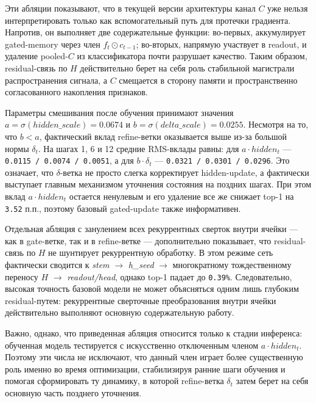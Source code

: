 \documentclass[11pt,landscape]{article}
\begin{document}
\medskip

\noindent
Эти абляции показывают, что в текущей версии архитектуры канал $C$ уже нельзя интерпретировать только как вспомогательный путь для протечки градиента. Напротив, он выполняет две содержательные функции: во-первых, аккумулирует gated-memory через член $f_t \odot c_{t-1}$; во-вторых, напрямую участвует в readout, и удаление pooled-$C$ из классификатора почти разрушает качество. Таким образом, residual-связь по $H$ действительно берет на себя роль стабильной магистрали распространения сигнала, а $C$ смещается в сторону памяти и пространственно согласованного накопления признаков.

\medskip

\noindent
Параметры смешивания после обучения принимают значения $a=\sigma(hidden\_scale)=0.0674$ и $b=\sigma(delta\_scale)=0.0255$. Несмотря на то, что $b < a$, фактический вклад refine-ветки оказывается выше из-за большой нормы $\delta_t$. На шагах 1, 6 и 12 средние RMS-вклады равны: для $a \cdot hidden_t$ --- \texttt{0.0115 / 0.0074 / 0.0051}, а для $b \cdot \delta_t$ --- \texttt{0.0321 / 0.0301 / 0.0296}. Это означает, что $\delta$-ветка не просто слегка корректирует hidden-update, а фактически выступает главным механизмом уточнения состояния на поздних шагах. При этом вклад $a \cdot hidden_t$ остается ненулевым и его удаление все же снижает top-1 на \texttt{3.52} п.п., поэтому базовый gated-update также информативен.

\medskip

\noindent
Отдельная абляция с занулением всех рекуррентных сверток внутри ячейки --- как в gate-ветке, так и в refine-ветке --- дополнительно показывает, что residual-связь по $H$ не шунтирует рекуррентную обработку. В этом режиме сеть фактически сводится к \textit{stem} $\rightarrow$ \textit{h\_seed} $\rightarrow$ многократному тождественному переносу $H$ $\rightarrow$ \textit{readout/head}, однако top-1 падает до \texttt{0.39\%}. Следовательно, высокая точность базовой модели не может объясняться одним лишь глубоким residual-путем: рекуррентные сверточные преобразования внутри ячейки действительно выполняют основную содержательную работу.

\medskip

\noindent
Важно, однако, что приведенная абляция относится только к стадии инференса: обученная модель тестируется с искусственно отключенным членом $a \cdot hidden_t$. Поэтому эти числа не исключают, что данный член играет более существенную роль именно во время оптимизации, стабилизируя ранние шаги обучения и помогая сформировать ту динамику, в которой refine-ветка $\delta_t$ затем берет на себя основную часть позднего уточнения.
\end{document}
